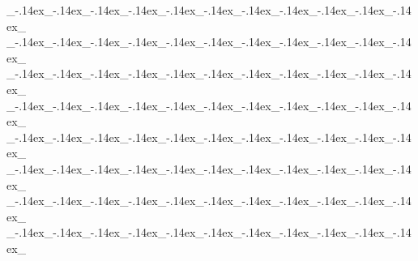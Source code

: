 \documentclass[HQ,english,Vampire]{VampireSheet}
\begin{document}
	\BigWoDSeperatorSheetNonText{}
	\begin{center}
		\vspace{-0.5\baselineskip}
		\begin{minipage}[t]{0.33333\textwidth}
			\raggedright
			\par
			\OtherTraits
			{\_\kern-.14ex\_\kern-.14ex\_\kern-.14ex\_\kern-.14ex\_\kern-.14ex\_\kern-.14ex\_\kern-.14ex\_\kern-.14ex\_\kern-.14ex\_\kern-.14ex\_\kern-.14ex\_}
			{\_\kern-.14ex\_\kern-.14ex\_\kern-.14ex\_\kern-.14ex\_\kern-.14ex\_\kern-.14ex\_\kern-.14ex\_\kern-.14ex\_\kern-.14ex\_\kern-.14ex\_\kern-.14ex\_}
			{\_\kern-.14ex\_\kern-.14ex\_\kern-.14ex\_\kern-.14ex\_\kern-.14ex\_\kern-.14ex\_\kern-.14ex\_\kern-.14ex\_\kern-.14ex\_\kern-.14ex\_\kern-.14ex\_}
			{\_\kern-.14ex\_\kern-.14ex\_\kern-.14ex\_\kern-.14ex\_\kern-.14ex\_\kern-.14ex\_\kern-.14ex\_\kern-.14ex\_\kern-.14ex\_\kern-.14ex\_\kern-.14ex\_}
			{\_\kern-.14ex\_\kern-.14ex\_\kern-.14ex\_\kern-.14ex\_\kern-.14ex\_\kern-.14ex\_\kern-.14ex\_\kern-.14ex\_\kern-.14ex\_\kern-.14ex\_\kern-.14ex\_}
			{\_\kern-.14ex\_\kern-.14ex\_\kern-.14ex\_\kern-.14ex\_\kern-.14ex\_\kern-.14ex\_\kern-.14ex\_\kern-.14ex\_\kern-.14ex\_\kern-.14ex\_\kern-.14ex\_}
			{\_\kern-.14ex\_\kern-.14ex\_\kern-.14ex\_\kern-.14ex\_\kern-.14ex\_\kern-.14ex\_\kern-.14ex\_\kern-.14ex\_\kern-.14ex\_\kern-.14ex\_\kern-.14ex\_}
			{\_\kern-.14ex\_\kern-.14ex\_\kern-.14ex\_\kern-.14ex\_\kern-.14ex\_\kern-.14ex\_\kern-.14ex\_\kern-.14ex\_\kern-.14ex\_\kern-.14ex\_\kern-.14ex\_}
		\end{minipage}%
		\begin{minipage}[t]{0.33333\textwidth}

\end{minipage}
\end{center}
\end{document}
